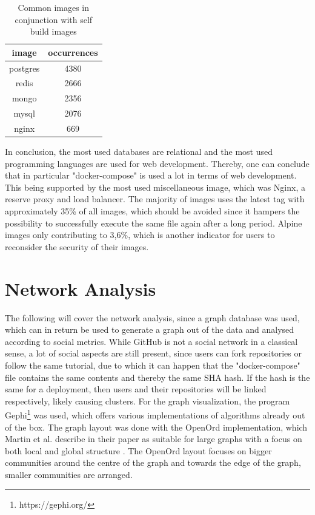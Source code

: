 \begin{table}[h!]
    \centering
    \begin{tabular}{ |c|c| }
    \hline
    image & occurrences \\
    \hline
         postgres & 4380 \\
         redis & 2666 \\
         mongo & 2356 \\
         mysql & 2076 \\
         nginx & 669 \\
    \hline
    \end{tabular}
    \caption{Common images in conjunction with self build images}
    \label{self_build_commons}
\end{table}

In conclusion, the most used databases are relational and the most used programming languages are used for web development. Thereby, one can conclude that in particular "docker-compose" is used a lot in terms of web development. This being supported by the most used miscellaneous image, which was Nginx, a reserve proxy and load balancer. The majority of images uses the latest tag with approximately 35\% of all images, which should be avoided since it hampers the possibility to successfully execute the same file again after a long period. Alpine images only contributing to 3,6\%, which is another indicator for users to reconsider the security of their images.

\section{Network Analysis}

The following will cover the network analysis, since a graph database was used, which can in return be used to generate a graph out of the data and analysed according to social metrics. While GitHub is not a social network in a classical sense, a lot of social aspects are still present, since users can fork repositories or follow the same tutorial, due to which it can happen that the "docker-compose" file contains the same contents and thereby the same SHA hash. If the hash is the same for a deployment, then users and their repositories will be linked respectively, likely causing clusters.
For the graph visualization, the program Gephi\footnote{https://gephi.org/} was used, which offers various implementations of algorithms already out of the box. The graph layout was done with the OpenOrd implementation, which Martin et al. describe in their paper as suitable for large graphs with a focus on both local and global structure \cite{openOrd}. The OpenOrd layout focuses on bigger communities around the centre of the graph and towards the edge of the graph, smaller communities are arranged.

